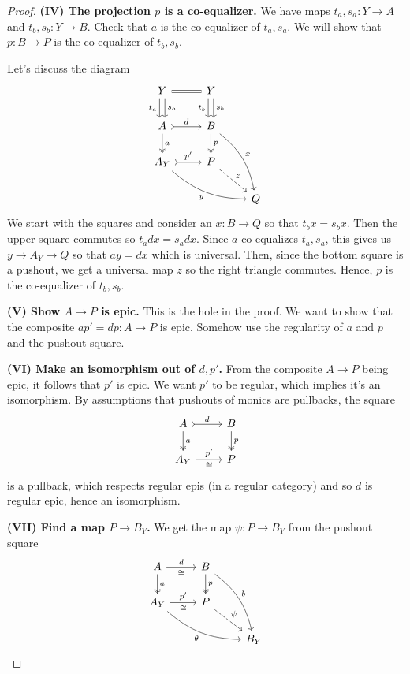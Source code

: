 \documentclass[12pt]{article}
\newcommand{\from}{\colon}
\renewcommand{\(}{\left(}
\renewcommand{\)}{\right)}
\renewcommand{\{}{\left\lbrace}
\renewcommand{\}}{\right\rbrace}
\theoremstyle{remark}
\theoremstyle{definition}
\begin{document}
\begin{proof}
		\textbf{(IV) The projection $p$ is a co-equalizer.} We have maps $t_a,s_a \from Y \to A$ and $t_b,s_b \from Y \to B$.  Check that $a$ is the co-equalizer of $t_a,s_a$.  We will show that $p \from B \to P$ is the co-equalizer of $t_b,s_b$.  
		
		Let's discuss the diagram
		\[
		\begin{tikzcd}
		{Y} 
		\ar[r,equal]
		\ar[d,shift left=1,"s_a"]
		\ar[d,shift left=-1,swap,"t_a"]&
		{Y} 
		\ar[d,shift left=1,"s_b"]
		\ar[d,shift left=-1,swap,"t_b"]&
		{} \\
		{A} 
		\ar[r,rightarrowtail,"d"]
		\ar[d,twoheadrightarrow,"a"] &
		{B} 
		\ar[d,twoheadrightarrow,"p"] 
		\ar[ddr,bend left=20,"x"]&
		{} \\
		{A_Y} 
		\ar[r,rightarrowtail,"p'"]
		\ar[rrd,bend right=20,swap,"y"] &
		{P} 
		\ar[dr,dashed,"z"]&
		{} \\
		{} &
		{} &
		{Q} 
		\end{tikzcd}
		\]
		We start with the squares and consider an $x \from B \to Q$ so that $t_bx=s_bx$.  Then the upper square commutes so $t_adx=s_adx$. Since $a$ co-equalizes $t_a,s_a$, this gives us $y \to A_Y \to Q$ so that $ay=dx$ which is universal.  Then, since the bottom square is a pushout, we get a universal map $z$ so the right triangle commutes.  Hence, $p$ is the co-equalizer of $t_b,s_b$.
		
		\textbf{(V) Show $A \to P$ is epic.} This is the hole in the proof.  We want to show that the composite $ap'=dp \from A \to P$ is epic.  Somehow use the regularity of $a$ and $p$ and the pushout square.
		
		\textbf{(VI) Make an isomorphism out of $d,p'$.} From the composite $A \to P$ being epic, it follows that $p'$ is epic.  We want $p'$ to be regular, which implies it's an isomorphism.  By assumptions that pushouts of monics are pullbacks, the square
		\[
		\begin{tikzcd}
		{A} 
		\ar[r,rightarrowtail,"d"]
		\ar[d,twoheadrightarrow,"a"] &
		{B} 
		\ar[d,twoheadrightarrow,"p"] \\
		{A_Y} 
		\ar[r,"p'","\cong"'] &
		{P} 
		\end{tikzcd}
		\] 
		is a pullback, which respects regular epis (in a regular category) and so $d$ is regular epic, hence an isomorphism.
		
		\textbf{(VII) Find a map $P \to B_Y$.} We get the map $\psi \from P \to B_Y$ from the pushout square
		\[
		\begin{tikzcd}
		{A} 
		\ar[r,"d", "\cong"']
		\ar[d,twoheadrightarrow,"a"] &
		{B} 
		\ar[d,twoheadrightarrow,"p"] 
		\ar[ddr,bend left=20,"b"] &
		{}\\
		{A_Y} 
		\ar[r,"p'","\cong"'] 
		\ar[rrd,bend right=20,"\theta"'] &
		{P} 
		\ar[rd,dashed,"\psi"]\\
		{} &
		{} &
		{B_Y} 
		\end{tikzcd}
		\]
		

\end{proof}
\end{document}
